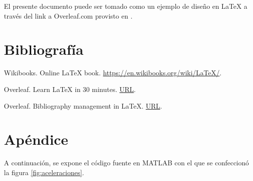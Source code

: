 \documentclass{article}
\begin{document}
El presente documento puede ser tomado como un ejemplo de diseño en \LaTeX{} a través del link a Overleaf.com provisto en \cite{Gonzalez2019}.


\section*{Bibliografía}

Wikibooks. Online \LaTeX{} book. \href{https://en.wikibooks.org/wiki/LaTeX/}{https://en.wikibooks.org/wiki/LaTeX/}.

Overleaf. Learn LaTeX in 30 minutes. \href{https://www.overleaf.com/learn/latex/Learn_LaTeX_in_30_minutes}{URL}.

Overleaf. Bibliography management in LaTeX. \href{https://www.overleaf.com/learn/latex/Bibliography_management_in_LaTeX}{URL}.








\section*{Apéndice}

A continuación, se expone el código fuente en MATLAB con el que se confeccionó la figura \ref{fig:aceleraciones}.

\inputminted{matlab}{figura_ejemplo.m}
\end{document}
